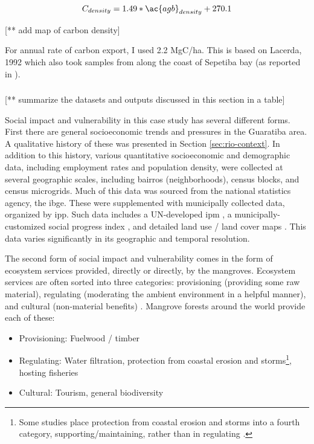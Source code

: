 \begin{equation}
\label{eq:carbon}
C_{density} = 1.49 * \ac{agb}_{density} + 270.1 
\end{equation}

[** add map of carbon density]

For annual rate of carbon export, I used 2.2 MgC/ha. This is based on Lacerda, 1992 which also took samples from along the coast of Sepetiba bay \cite{lacerda1992carbon} (as reported in \cite{jennerjahnRelevanceMangrovesProduction2002}).


\subsubsection{} \label{sec:rio-vulnerability}

[** summarize the datasets and outputs discussed in this section in a table]

Social impact and vulnerability in this case study has several different forms. First there are general socioeconomic trends and pressures in the Guaratiba area. A qualitative history of these was presented in Section \ref{sec:rio-context}. In addition to this history, various quantitative socioeconomic and demographic data, including employment rates and population density, were collected at several geographic scales, including bairros (neighborhoods), census blocks, and census microgrids. Much of this data was sourced from the national statistics agency, the \ac{ibge}. These were supplemented with municipally collected data, organized by \ac{ipp}. Such data includes a UN-developed \ac{ipm} \cite{oxfordpovertyandhumandevelopmentinitiativeChartingPathewaysOut2020}, a municipally-customized social progress index \cite{puliciRelatorioMetodologicoIndice2016}, and detailed land use / land cover maps \cite{regoAutomaticClassificationLand2003}. This data varies significantly in its geographic and temporal resolution. 

The second form of social impact and vulnerability comes in the form of ecosystem services provided, directly or directly, by the mangroves. Ecosystem services are often sorted into three categories: provisioning (providing some raw material), regulating (moderating the ambient environment in a helpful manner), and cultural (non-material benefits) \cite{haines-youngCommonInternationalClassification2018}. Mangrove forests around the world provide each of these:

\begin{itemize}[itemsep=0pt,parsep=0pt]
	\item{Provisioning: Fuelwood / timber}
	\item{Regulating: Water filtration, protection from coastal erosion and storms\footnote{Some studies place protection from coastal erosion and storms into a fourth category, supporting/maintaining, rather than in regulating \cite{getznerEcosystemServicesMangrove2020}.}, hosting fisheries}
	\item{Cultural: Tourism, general biodiversity}
\end{itemize}

